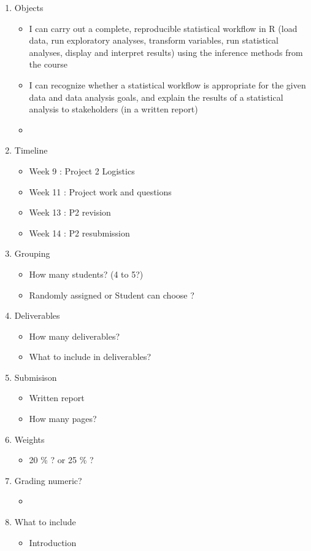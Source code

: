 \documentclass[12pt]{article}
\begin{document}
\begin{enumerate}
    \item Objects
    \begin{itemize}
        \item I can carry out a complete, reproducible statistical workflow in R (load data, run exploratory analyses, transform variables, run statistical analyses, display and interpret results) using the inference methods from the course 
        \item I can recognize whether a statistical workflow is appropriate for the given data and data analysis goals, and explain the results of a statistical analysis to stakeholders (in a written report)
        \item 
    \end{itemize}
    \item Timeline
    \begin{itemize}
        \item Week 9 : Project 2 Logistics 
        \item Week 11 : Project work and questions
        \item Week 13 : P2 revision
        \item Week 14 : P2 resubmission  
    \end{itemize}

    \item  Grouping 
    \begin{itemize}
        \item How many students? (4 to 5?)
        \item Randomly assigned or Student can choose ? 
    \end{itemize}
    \item Deliverables
    \begin{itemize}
        \item How many deliverables? 
        \item What to include in deliverables? 
    \end{itemize} 
    \item Submisison
    \begin{itemize}
        \item Written report 
        \item How many pages? 
    \end{itemize}
    \item Weights
    \begin{itemize}
        \item 20 \% ? or 25 \% ? 
    \end{itemize}
    \item Grading numeric? 
    \begin{itemize}
        \item 
    \end{itemize}
    \item What to include
    \begin{itemize}
        \item Introduction
    \end{itemize}


\end{enumerate}
    
\end{document}
